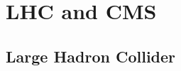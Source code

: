 \chapter{LHC and CMS}
\label{chap:lhc_and_cms}

	\section{Large Hadron Collider}
		\label{sec:lhc_and_cms__large_hadron_collider}


